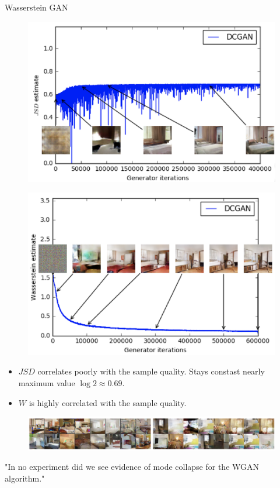 \begin{frame}{Wasserstein GAN}
	\begin{minipage}[t]{0.49\columnwidth}
		\begin{figure}
			\centering
			\includegraphics[width=1.0\linewidth]{figs/dcgan_quality}
		\end{figure}
	\end{minipage}%
	\begin{minipage}[t]{0.49\columnwidth}
		\begin{figure}
			\centering
			\includegraphics[width=1.0\linewidth]{figs/wgan_quality}
		\end{figure}
	\end{minipage}
	\begin{itemize}
		\item $JSD$ correlates poorly with the sample quality. Stays constast nearly maximum value $\log 2 \approx 0.69$.
		\item $W$ is highly correlated with the sample quality. 
	\end{itemize}
	\begin{figure}
		\centering
		\includegraphics[width=1.0\linewidth]{figs/wgan_mode_collapse}
	\end{figure}
	"In no experiment did we see evidence of mode collapse for the WGAN algorithm."


\end{frame}
